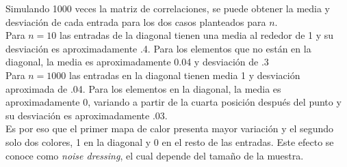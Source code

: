 \documentclass[paper=letter, fontsize=14pt]{scrartcl}
\numberwithin{equation}{section} %
\numberwithin{figure}{section} %
\numberwithin{table}{section} %
\begin{document}
Simulando 1000 veces la matriz de correlaciones, se puede obtener la media y desviación de cada entrada para los dos casos planteados para $n$.\\

Para $n=10$ las entradas de la diagonal tienen una media al rededor de 1 y su desviación es aproximadamente .4. Para los elementos que no están en la diagonal, la media es aproximadamente 0.04 y desviación de .3\\

Para $n=1000$ las entradas en la diagonal tienen media 1 y desviación aproximada de .04. Para los elementos en la diagonal, la media es aproximadamente 0, variando a partir de la cuarta posición después del punto y su desviación es aproximadamente .03.\\

Es por eso que el primer mapa de calor presenta mayor variación y el segundo solo dos colores, 1 en la diagonal y 0 en el resto de las entradas. Este efecto se conoce como \emph{noise dressing}, el cual depende del tamaño de la muestra.
\end{document}
